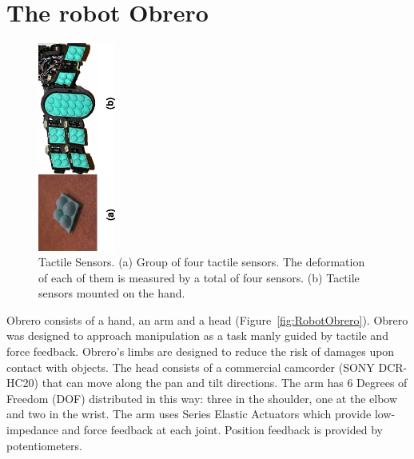 \section{The robot Obrero}
\label{sec:platform}


\begin{figure}[tbp]
\centerline{
\includegraphics[width=1.0in, angle=270 ]{./figures/Tactiles.eps}
} \caption{Tactile Sensors. (a) Group of four tactile sensors. The 
deformation of each of them is measured by a total of four sensors. 
(b) Tactile sensors mounted on the hand.} \label{fig:TactileSensors}
\end{figure}

Obrero \cite{obrero} consists of a hand, an arm and a head
(Figure~\ref{fig:RobotObrero}). Obrero was designed to approach
manipulation as a task manly guided by tactile and force feedback.
Obrero's limbs are designed to
reduce the risk of damages upon contact with objects. 
The head consists of a
commercial camcorder (SONY DCR-HC20) that can move along the pan
and tilt directions. The arm has 6 Degrees of Freedom (DOF)
distributed in this way: three in the shoulder, one at the elbow
and two in the wrist. The arm \cite{AaronArm} uses Series Elastic
Actuators \cite{williamson95series} which provide low-impedance
and force feedback at each joint. Position feedback is provided by
potentiometers.

